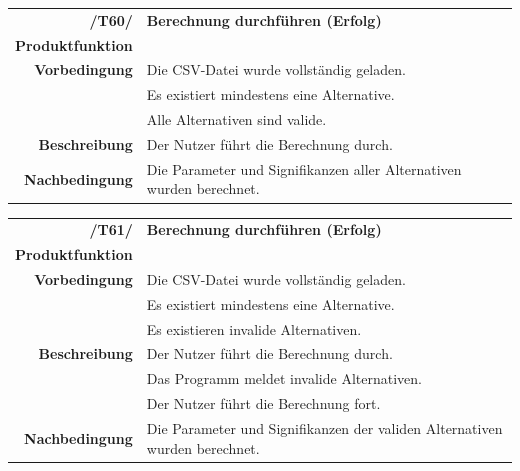 \documentclass{article}
\begin{document}
\begin{table}[H]
\begin{tabularx}{\textwidth}{rX} \vspace{1mm}
\textbf{/T60/}         & \textbf{Berechnung durchführen (Erfolg)} \\ \vspace{1mm}
\textbf{Produktfunktion} & \nameref{sec:f:Berechnung durchführen} \\
\textbf{Vorbedingung}  & Die CSV-Datei wurde vollständig geladen. \\ & Es existiert mindestens eine Alternative. \\ \vspace{1mm} & Alle Alternativen sind valide. \\ \vspace{1mm}
\textbf{Beschreibung}  & Der Nutzer führt die Berechnung durch. \\
\textbf{Nachbedingung} & Die Parameter und Signifikanzen aller Alternativen wurden berechnet.
\end{tabularx}
\end{table}

\begin{table}[H]
\begin{tabularx}{\textwidth}{rX} \vspace{1mm}
\textbf{/T61/}         & \textbf{Berechnung durchführen (Erfolg)} \\ \vspace{1mm}
\textbf{Produktfunktion} & \nameref{sec:f:Berechnung durchführen} \\
\textbf{Vorbedingung}  & Die CSV-Datei wurde vollständig geladen. \\ & Es existiert mindestens eine Alternative. \\ \vspace{1mm} & Es existieren invalide Alternativen. \\
\textbf{Beschreibung}  & Der Nutzer führt die Berechnung durch. \\ & Das Programm meldet invalide Alternativen. \\ \vspace{1mm} & Der Nutzer führt die Berechnung fort. \\
\textbf{Nachbedingung} & Die Parameter und Signifikanzen der validen Alternativen wurden berechnet.
\end{tabularx}
\end{table}
\end{document}
